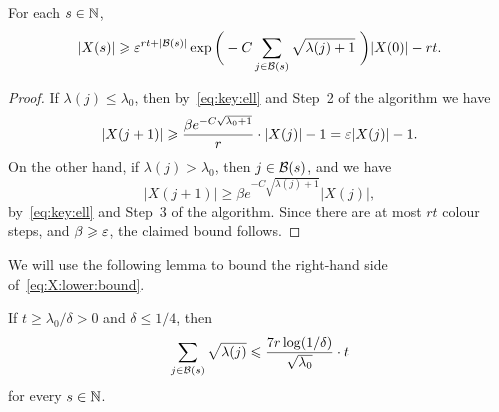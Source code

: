 \begin{lemma}\label{lem:X:lower:bound}
For each $s \in \mathbb{N}$, 
\begin{equation}\label{eq:X:lower:bound}
|X(s)| \geqslant \varepsilon^{rt + |\mathcal{B}(s)|} \exp\bigg( - C \sum_{j \in \mathcal{B}(s)} \sqrt{\lambda(j)+1}\,\, \bigg) |X(0)| - rt.
\end{equation}
\end{lemma}

\begin{proof}
If $\lambda(j) \le \lambda_0$, then by~\eqref{eq:key:ell} and Step~2 of the algorithm we have
$$|X(j+1)| \geqslant \frac{\beta e^{- C \sqrt{\lambda_0 + 1}}}{r} \cdot |X(j)| - 1 = \varepsilon |X(j)| - 1.$$ 
On the other hand, if $\lambda(j) > \lambda_0$, then $j \in \mathcal{B}(s)$, and we have 
$$|X(j+1)| \ge \beta e^{- C \sqrt{\lambda(j) + 1}} |X(j)|,$$ 
by~\eqref{eq:key:ell} and Step~3 of the algorithm. Since there are at most $rt$ colour steps, and $\beta \geqslant \varepsilon$, the claimed bound follows.
\end{proof}

We will use the following lemma to bound the right-hand side of~\eqref{eq:X:lower:bound}. 

\begin{lemma}\label{lem:sum:of:lambdas}
If\/ $t \ge \lambda_0 / \delta > 0$ and\/ $\delta \le 1/4$, then
$$\sum_{j \in \mathcal{B}(s)} \sqrt{\lambda(j)} \leqslant \frac{7r \log(1/\delta)}{\sqrt{\lambda_0}} \cdot t$$
for every $s \in \mathbb{N}$. 
\end{lemma}


